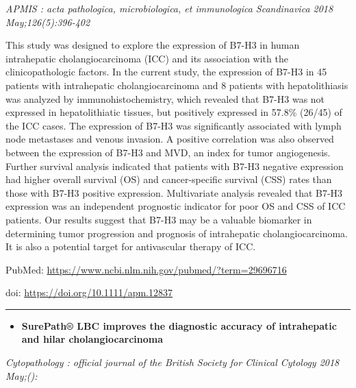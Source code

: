 \documentclass[]{article}
\providecommand{\tightlist}{%
  \setlength{\itemsep}{0pt}\setlength{\parskip}{0pt}}
\begin{document}
\emph{APMIS : acta pathologica, microbiologica, et immunologica
Scandinavica 2018 May;126(5):396-402}

This study was designed to explore the expression of B7-H3 in human
intrahepatic cholangiocarcinoma (ICC) and its association with the
clinicopathologic factors. In the current study, the expression of B7-H3
in 45 patients with intrahepatic cholangiocarcinoma and 8 patients with
hepatolithiasis was analyzed by immunohistochemistry, which revealed
that B7-H3 was not expressed in hepatolithiatic tissues, but positively
expressed in 57.8\% (26/45) of the ICC cases. The expression of B7-H3
was significantly associated with lymph node metastases and venous
invasion. A positive correlation was also observed between the
expression of B7-H3 and MVD, an index for tumor angiogenesis. Further
survival analysis indicated that patients with B7-H3 negative expression
had higher overall survival (OS) and cancer-specific survival (CSS)
rates than those with B7-H3 positive expression. Multivariate analysis
revealed that B7-H3 expression was an independent prognostic indicator
for poor OS and CSS of ICC patients. Our results suggest that B7-H3 may
be a valuable biomarker in determining tumor progression and prognosis
of intrahepatic cholangiocarcinoma. It is also a potential target for
antivascular therapy of ICC.

PubMed: \url{https://www.ncbi.nlm.nih.gov/pubmed/?term=29696716}

doi: \url{https://doi.org/10.1111/apm.12837}

{}

{}

\begin{center}\rule{0.5\linewidth}{\linethickness}\end{center}

\begin{itemize}
\tightlist
\item
  \textbf{SurePath® LBC improves the diagnostic accuracy of intrahepatic
  and hilar cholangiocarcinoma}
\end{itemize}

\emph{Cytopathology : official journal of the British Society for
Clinical Cytology 2018 May;():}
\end{document}
